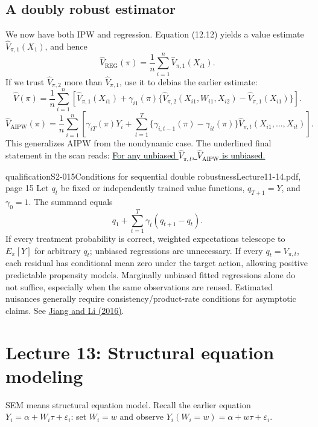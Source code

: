 \subsection{A doubly robust estimator}
We now have both IPW and regression. Equation (12.12) yields a value estimate $\widehat V_{\pi,1}(X_1)$, and hence
\[
 \widehat V_{\mathrm{REG}}(\pi)=\frac1n\sum_{i=1}^n\widehat V_{\pi,1}(X_{i1}).
\]
If we trust $\widehat V_{\pi,2}$ more than $\widehat V_{\pi,1}$, use it to debias the earlier estimate:
\[
 \widehat V(\pi)=\frac1n\sum_{i=1}^n\left[
 \widehat V_{\pi,1}(X_{i1})+
 \gamma_{i1}(\pi)\{
 \widehat V_{\pi,2}(X_{i1},W_{i1},X_{i2})
 -\widehat V_{\pi,1}(X_{i1})\}\right].
\]
\[
 \widehat V_{\mathrm{AIPW}}(\pi)
 =\frac1n\sum_{i=1}^n\left[
 \gamma_{iT}(\pi)Y_i+
 \sum_{t=1}^T\{\gamma_{i,t-1}(\pi)-\gamma_{it}(\pi)\}
 \widehat V_{\pi,t}(X_{i1},\ldots,X_{it})\right].
\]
This generalizes AIPW from the nondynamic case.
 The underlined final statement in the scan reads: \textcolor{red}{\underline{\textcolor{black}{For any unbiased $\widehat V_{\pi,t}$, $\widehat V_{\mathrm{AIPW}}$ is unbiased.}}}
\begin{reviewnote}{qualification}{S2-015}{Conditions for sequential double robustness}{Lecture11-14.pdf, page 15}
Let $q_t$ be fixed or independently trained value functions, $q_{T+1}=Y$, and $\gamma_0=1$. The summand equals
\[
 q_1+\sum_{t=1}^T\gamma_t(q_{t+1}-q_t).
\]
If every treatment probability is correct, weighted expectations telescope to $E_\pi[Y]$ for arbitrary $q_t$; unbiased regressions are unnecessary. If every $q_t=V_{\pi,t}$, each residual has conditional mean zero under the target action, allowing positive predictable propensity models. Marginally unbiased fitted regressions alone do not suffice, especially when the same observations are reused. Estimated nuisances generally require consistency/product-rate conditions for asymptotic claims. See \href{https://proceedings.mlr.press/v48/jiang16.html}{Jiang and Li (2016)}.
\end{reviewnote}


\section{Lecture 13: Structural equation modeling}
SEM means structural equation model. Recall the earlier equation $Y_i=\alpha+W_i\tau+\varepsilon_i$: set $W_i=w$ and observe $Y_i(W_i=w)=\alpha+w\tau+\varepsilon_i$.

